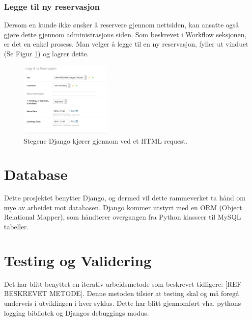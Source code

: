 \subsubsection*{Legge til ny reservasjon}
Dersom en kunde ikke ønsker å reservere gjennom nettsiden, kan ansatte også gjøre dette gjennom administrasjons siden. Som beskrevet i Workflow seksjonen, er det en enkel prosess. Man velger å legge til en ny reservasjon, fyller ut vinduet (Se Figur \ref{fig:admin_new_res}) og lagrer dette.


\begin{figure}
\caption[Django Oversikt]{Stegene Django kjører gjennom ved et HTML request. }\label{fig:admin_new_res}
\includegraphics[width=4.5cm]{Bilder/admin_ny_reservasjon.png}
\end{figure}

\clearpage
\section{Database}
Dette prosjektet benytter Django, og dermed vil dette rammeverket ta hånd om mye av arbeidet mot databasen. Django kommer utstyrt med en ORM (Object Relational Mapper), som håndterer overgangen fra Python klasseer til MySQL tabeller. 

\clearpage
\section{Testing og Validering}
Det har blitt benyttet en iterativ arbeidsmetode som beskrevet tidligere: [REF BESKREVET METODE]. Denne metoden tilsier at testing skal og må foregå underveis i utviklingen i hver syklus. Dette har blitt gjennomført vha. pythons logging bibliotek og Djangos debuggings modus. 


